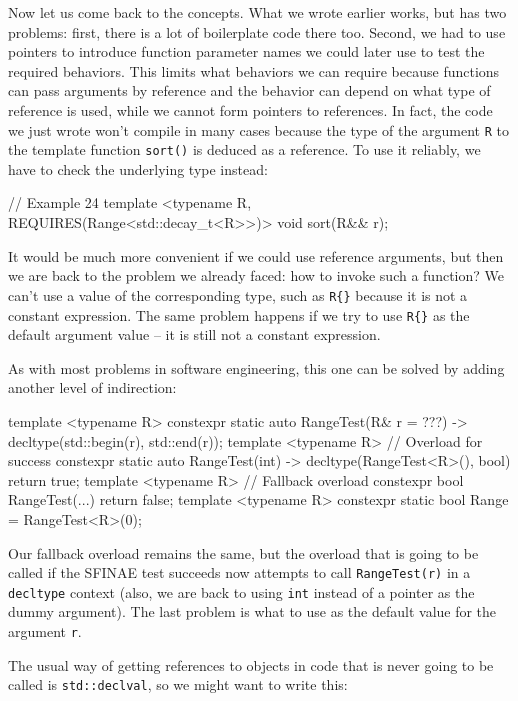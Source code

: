 Now let us come back to the concepts. What we wrote earlier works, but has two problems: first, there is a lot of boilerplate code there too. Second, we had to use pointers to introduce function parameter names we could later use to test the required behaviors. This limits what behaviors we can require because functions can pass arguments by reference and the behavior can depend on what type of reference is used, while we cannot form pointers to references. In fact, the code we just wrote won't compile in many cases because the type of the argument \texttt{R} to the template function \texttt{sort()} is deduced as a reference. To use it reliably, we have to check the underlying type instead:

\begin{code}
// Example 24
template <typename R, REQUIRES(Range<std::decay_t<R>>)>
void sort(R&& r);
\end{code}

It would be much more convenient if we could use reference arguments, but then we are back to the problem we already faced: how to invoke such a function? We can't use a value of the corresponding type, such as \texttt{R\{\}} because it is not a constant expression. The same problem happens if we try to use \texttt{R\{\}} as the default argument value -- it is still not a constant expression.

As with most problems in software engineering, this one can be solved by adding another level of indirection:

\begin{code}
template <typename R>
constexpr static auto RangeTest(R& r = ???) ->
  decltype(std::begin(r), std::end(r));
template <typename R>        // Overload for success
constexpr static auto RangeTest(int) ->
  decltype(RangeTest<R>(), bool{}) { return true; }
template <typename R>        // Fallback overload
constexpr bool RangeTest(...) { return false; }
template <typename R>
constexpr static bool Range = RangeTest<R>(0);
\end{code}

Our fallback overload remains the same, but the overload that is going to be called if the SFINAE test succeeds now attempts to call \texttt{RangeTest(r)} in a \texttt{decltype} context (also, we are back to using \texttt{int} instead of a pointer as the dummy argument). The last problem is what to use as the default value for the argument \texttt{r}.

The usual way of getting references to objects in code that is never going to be called is \texttt{std::declval}, so we might want to write this:

